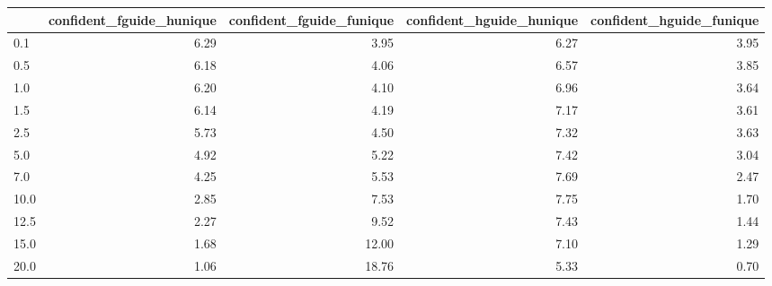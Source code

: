 \begin{tabular}{lrrrr}
\toprule
 & confident_fguide_hunique & confident_fguide_funique & confident_hguide_hunique & confident_hguide_funique \\
\midrule
0.1 & 6.29 & 3.95 & 6.27 & 3.95 \\
0.5 & 6.18 & 4.06 & 6.57 & 3.85 \\
1.0 & 6.20 & 4.10 & 6.96 & 3.64 \\
1.5 & 6.14 & 4.19 & 7.17 & 3.61 \\
2.5 & 5.73 & 4.50 & 7.32 & 3.63 \\
5.0 & 4.92 & 5.22 & 7.42 & 3.04 \\
7.0 & 4.25 & 5.53 & 7.69 & 2.47 \\
10.0 & 2.85 & 7.53 & 7.75 & 1.70 \\
12.5 & 2.27 & 9.52 & 7.43 & 1.44 \\
15.0 & 1.68 & 12.00 & 7.10 & 1.29 \\
20.0 & 1.06 & 18.76 & 5.33 & 0.70 \\
\bottomrule
\end{tabular}
